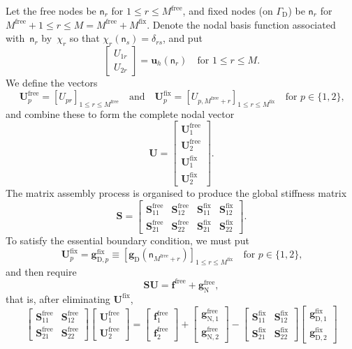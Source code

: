 \documentclass[a4paper,12pt]{article}
\newcommand{\bs}[1]{\boldsymbol{#1}}
\newcommand{\uD}{\mathrm{D}}
\newcommand{\uN}{\mathrm{N}}
\newcommand{\GammaD}{\Gamma_{\uD}}
\newcommand{\free}{^{\mathrm{free}}}
\newcommand{\fix}{^{\mathrm{fix}}}
\begin{document}
Let the free nodes be $\mathsf{n}_r$ for $1\le r\le M\free$, and fixed nodes 
(on $\GammaD$) be $\mathsf{n}_r$ for $M\free+1\le r\le M=M\free+M\fix$.  Denote 
the nodal basis function associated with~$\mathsf{n}_r$ by~$\chi_r$ so that
$\chi_r(\mathsf{n}_s)=\delta_{rs}$, and put
\[
\begin{bmatrix}U_{1r}\\ U_{2r}\end{bmatrix}=\bs{u}_h(\mathsf{n}_r)
\quad\text{for $1\le r\le M$.}
\]
We define the vectors
\[
\bs{U}_p\free=[U_{pr}]_{1\le r\le M\free}
\quad\text{and}\quad
\bs{U}_p\fix=[U_{p,M\free+r}]_{1\le r\le M\fix}\quad\text{for $p\in\{1,2\}$,}
\]
and combine these to form the complete nodal vector
\[
\bs{U}=\left[\begin{array}{c}
\bs{U}_1\free\\ \bs{U}_2\free\\ 
\bs{U}_1\fix\\ \bs{U}_2\fix\end{array}\right].
\]
The matrix assembly process is organised to produce the global stiffness matrix
\[
\renewcommand{\arraystretch}{1.2}
\bs{S}=\left[\begin{array}{c|c|c|c}
\bs{S}_{11}\free&\bs{S}_{12}\free&\bs{S}_{11}\fix&\bs{S}_{12}\fix\\
\hline
\bs{S}_{21}\free&\bs{S}_{22}\free&\bs{S}_{21}\fix&\bs{S}_{22}\fix
\end{array}\right].
\]
To satisfy the essential boundary condition, we must put
\[
\bs{U}\fix_p=\bs{g}_{\uD,p}\fix
    \equiv[\bs{g}_{\uD}(\mathsf{n}_{M\free+r})]_{1\le r\le M\fix}
\quad\text{for $p\in\{1,2\}$,}
\]
and then require
\[
\bs{S}\bs{U}=\bs{f}\free+\bs{g}_{\uN}\free,
\]
that is, after eliminating $\bs{U}\fix$,
\[
\renewcommand{\arraystretch}{1.2}
\left[\begin{array}{c|c}
\bs{S}_{11}\free&\bs{S}_{12}\free\\ \hline
\bs{S}_{21}\free&\bs{S}_{22}\free\end{array}\right]
\left[\begin{array}{c}\bs{U}_1\free\\ \hline \bs{U}_2\free\end{array}\right]
=\left[\begin{array}{c}\bs{f}_1\free\\ \hline \bs{f}_2\free\end{array}\right]
+\left[\begin{array}{c}\bs{g}_{\uN,1}\free\\ \hline 
    \bs{g}_{\uN,2}\free\end{array}\right]
    -\left[\begin{array}{c|c}
\bs{S}_{11}\fix&\bs{S}_{12}\fix\\ \hline
\bs{S}_{21}\fix&\bs{S}_{22}\fix\end{array}\right]
\left[\begin{array}{c}\bs{g}_{\uD,1}\fix\\ \hline 
    \bs{g}_{\uD,2}\fix\end{array}\right]
\]
\end{document}
